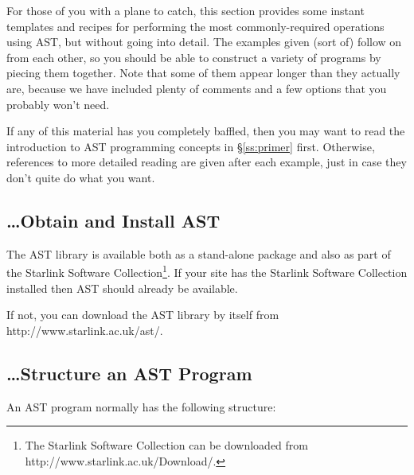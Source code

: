 \documentclass[twoside,11pt]{article}
\newcommand{\htmladdnormallink}[2]{#1}
\newcommand{\secref}[1]{\S\ref{#1}}
\newcommand{\secref}[1]{\ref{#1}}
\begin{document}
For those of you with a plane to catch, this section provides some
instant templates and recipes for performing the most
commonly-required operations using AST, but without going into
detail. The examples given (sort of) follow on from each other, so you
should be able to construct a variety of programs by piecing them
together.  Note that some of them appear longer than they actually
are, because we have included plenty of comments and a few options
that you probably won't need.

If any of this material has you completely baffled, then you may want
to read the introduction to AST programming concepts in
\secref{ss:primer} first. Otherwise, references to more detailed
reading are given after each example, just in case they don't quite do
what you want.

\subsection{\ldots Obtain and Install AST}
The AST library is available both as a stand-alone package and also as
part of the Starlink Software Collection\footnote{The Starlink Software
Collection can be downloaded from
\htmladdnormallink{http://www.starlink.ac.uk/Download/}
{http://www.starlink.ac.uk/Download/}.}. If your site has the Starlink
Software Collection installed then AST should already be available.

If not, you can download the AST library by itself from
\htmladdnormallink{http://www.starlink.ac.uk/ast/}
{http://www.starlink.ac.uk/ast/}.

\subsection{\ldots Structure an AST Program}

An AST program normally has the following structure:
\end{document}
